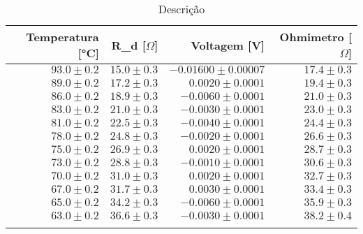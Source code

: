 
        \def\arraystretch{1.2}
        \begin{table}[H]
            \centering
            \caption{Descrição}
            \begin{tabular}{r|r|r|r}
            \toprule
            \midrule
Temperatura [°C] & R_d [$\Omega$] & Voltagem [V] & Ohmimetro [$\Omega$] \\\hline
$93.0 \pm 0.2$ & $15.0 \pm 0.3$ & $-0.01600 \pm 0.00007$ & $17.4 \pm 0.3$ \\
$89.0 \pm 0.2$ & $17.2 \pm 0.3$ & $0.0020 \pm 0.0001$ & $19.4 \pm 0.3$ \\
$86.0 \pm 0.2$ & $18.9 \pm 0.3$ & $-0.0060 \pm 0.0001$ & $21.0 \pm 0.3$ \\
$83.0 \pm 0.2$ & $21.0 \pm 0.3$ & $-0.0030 \pm 0.0001$ & $23.0 \pm 0.3$ \\
$81.0 \pm 0.2$ & $22.5 \pm 0.3$ & $-0.0040 \pm 0.0001$ & $24.4 \pm 0.3$ \\
$78.0 \pm 0.2$ & $24.8 \pm 0.3$ & $-0.0020 \pm 0.0001$ & $26.6 \pm 0.3$ \\
$75.0 \pm 0.2$ & $26.9 \pm 0.3$ & $0.0020 \pm 0.0001$ & $28.7 \pm 0.3$ \\
$73.0 \pm 0.2$ & $28.8 \pm 0.3$ & $-0.0010 \pm 0.0001$ & $30.6 \pm 0.3$ \\
$70.0 \pm 0.2$ & $31.0 \pm 0.3$ & $0.0020 \pm 0.0001$ & $32.7 \pm 0.3$ \\
$67.0 \pm 0.2$ & $31.7 \pm 0.3$ & $0.0030 \pm 0.0001$ & $33.4 \pm 0.3$ \\
$65.0 \pm 0.2$ & $34.2 \pm 0.3$ & $-0.0060 \pm 0.0001$ & $35.9 \pm 0.3$ \\
$63.0 \pm 0.2$ & $36.6 \pm 0.3$ & $-0.0030 \pm 0.0001$ & $38.2 \pm 0.4$ \\
            \bottomrule
            \label{etiqueta}
            \end{tabular}
        \end{table}
